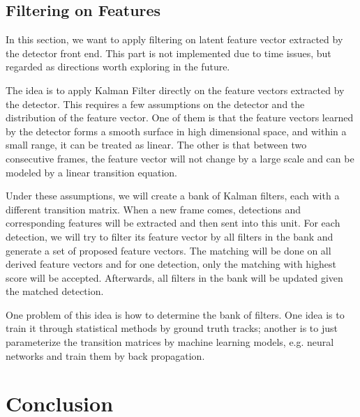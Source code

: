\documentclass[conference]{IEEEtran}
\begin{document}
\subsection{Filtering on Features}

In this section, we want to apply filtering on latent feature vector extracted by the detector front end. This part is not implemented due to time issues, but regarded as directions worth exploring in the future.

The idea is to apply Kalman Filter directly on the feature vectors extracted by the detector. This requires a few assumptions on the detector and the distribution of the feature vector. One of them is that the feature vectors learned by the detector forms a smooth surface in high dimensional space, and within a small range, it can be treated as linear.  The other is that between two consecutive frames, the feature vector will not change by a large scale and can be modeled by a linear transition equation.

Under these assumptions, we will create a bank of Kalman filters, each with a different transition matrix. When a new frame comes, detections and corresponding features will be extracted and then sent into this unit. For each detection, we will try to filter its feature vector by all filters in the bank and generate a set of proposed feature vectors. The matching will be done on all derived feature vectors and for one detection, only the matching with highest score will be accepted. Afterwards, all filters in the bank will be updated given the matched detection.

One problem of this idea is how to determine the bank of filters. One idea is to train it through statistical methods by ground truth tracks; another is to just parameterize the transition matrices by machine learning models, e.g. neural networks and train them by back propagation. 

\section{Conclusion}





\end{document}
